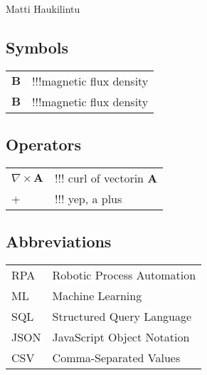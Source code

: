 \documentclass[english, 12pt, a4paper, elec, utf8, a-1b, online]{aaltothesis}
\begin{document}
\vspace{5mm}
{\hfill Matti Haukilintu \hspace{1cm}}

\newpage


\thesistableofcontents



\subsection*{Symbols}

\begin{tabular}{ll}
  $\mathbf{B}$  & !!!magnetic flux density  \\
  $\mathbf{B}$  & !!!magnetic flux density

\end{tabular}

\subsection*{Operators}

\begin{tabular}{ll}
  $\nabla \times \mathbf{A}$    & !!! curl of vectorin $\mathbf{A}$\\
  +     & !!! yep, a plus
\end{tabular}

\subsection*{Abbreviations}

\begin{tabular}{ll}
  RPA         & Robotic Process Automation \\
  ML          & Machine Learning \\
  SQL         & Structured Query Language \\
  JSON        & JavaScript Object Notation \\
  CSV         & Comma-Separated Values
\end{tabular}




\cleardoublepage




\end{document}
